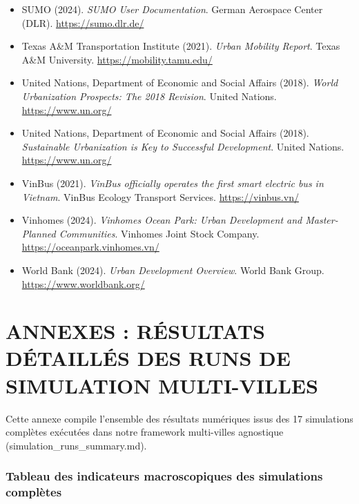 \documentclass[10pt, a4paper]{article}
\begin{document}
\begin{itemize}
  \url{https://streamlit.io/}
\item
  SUMO (2024). \emph{SUMO User Documentation}. German Aerospace Center
  (DLR). \url{https://sumo.dlr.de/}
\item
  Texas A\&M Transportation Institute (2021). \emph{Urban Mobility
  Report}. Texas A\&M University. \url{https://mobility.tamu.edu/}
\item
  United Nations, Department of Economic and Social Affairs (2018).
  \emph{World Urbanization Prospects: The 2018 Revision}. United
  Nations. \url{https://www.un.org/}
\item
  United Nations, Department of Economic and Social Affairs (2018).
  \emph{Sustainable Urbanization is Key to Successful Development}.
  United Nations. \url{https://www.un.org/}
\item
  VinBus (2021). \emph{VinBus officially operates the first smart
  electric bus in Vietnam}. VinBus Ecology Transport Services.
  \url{https://vinbus.vn/}
\item
  Vinhomes (2024). \emph{Vinhomes Ocean Park: Urban Development and
  Master-Planned Communities}. Vinhomes Joint Stock Company.
  \url{https://oceanpark.vinhomes.vn/}
\item
  World Bank (2024). \emph{Urban Development Overview}. World Bank
  Group. \url{https://www.worldbank.org/}
\end{itemize}

\newpage

\section{ANNEXES : RÉSULTATS DÉTAILLÉS DES RUNS DE SIMULATION
MULTI-VILLES}\label{annexes-ruxe9sultats-duxe9tailluxe9s-des-runs-de-simulation-multi-villes}

Cette annexe compile l'ensemble des résultats numériques issus des 17
simulations complètes exécutées dans notre framework multi-villes
agnostique (simulation\_runs\_summary.md).

\subsubsection{Tableau des indicateurs macroscopiques des simulations
complètes}\label{tableau-des-indicateurs-macroscopiques-des-simulations-compluxe8tes}
\end{document}
